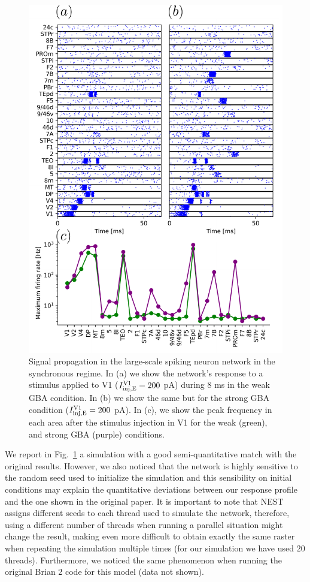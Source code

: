 \begin{figure}[!ht]
 \centering
     \includegraphics[scale=0.6]{figures/fig6.pdf}
 \caption{Signal propagation in the large-scale spiking neuron network in the synchronous regime. In (a) we show the network's response to a stimulus applied to V1 ($I_{\rm inj, E}^{\rm V1} = 200$ pA) during $8$ ms in the weak GBA condition. In (b) we show the same but for the strong GBA condition  ($I_{\rm inj, E}^{\rm V1} = 200$ pA). In (c), we show the peak frequency in each area after the stimulus injection in V1 for the weak (green), and strong GBA (purple) conditions. }\label{fig:fig4}
\end{figure}

We report in Fig.~\ref{fig:fig4} a simulation with a good semi-quantitative match with the original results. However, we also noticed that the network is highly sensitive to the random seed used to initialize the simulation and this sensibility on initial conditions may explain the quantitative deviations between our response profile and the one shown in the original paper. It is important to note that NEST assigns different seeds to each thread used to simulate the network, therefore, using a different number of threads when running a parallel situation might change the result, making even more difficult to obtain exactly the same raster when repeating the simulation multiple times (for our simulation we have used $20$ threads). Furthermore, we noticed the same phenomenon  when running the original Brian 2 code for this model (data not shown).

